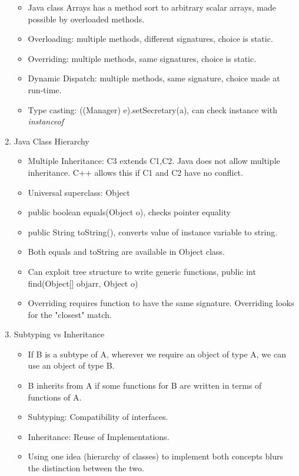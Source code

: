 \documentclass[a4paper]{article}
\begin{document}
\begin{enumerate}
\begin{itemize}
        \item Java class Arrays has a method sort to arbitrary scalar arrays, made possible by overloaded methods.
        \item Overloading: multiple methods, different signatures, choice is static.
        \item Overriding: multiple methods, same signatures, choice is static.
        \item Dynamic Dispatch: multiple methods, same signature, choice made at run-time.
        \item Type casting: ((Manager) e).setSecretary(a), can check instance with \textit{instanceof}
    \end{itemize}
    \item Java Class Hierarchy
    \begin{itemize}
        \item Multiple Inheritance: C3 extends C1,C2. Java does not allow multiple inheritance. C++ allows this if C1 and C2 have no conflict.
        \item Universal superclass: Object
        \item public boolean equals(Object o), checks pointer equality
        \item public String toString(), converts value of instance variable to string.
        \item Both equals and toString are available in Object class.
        \item Can exploit tree structure to write generic functions, public int find(Object[] objarr, Object o)
        \item Overriding requires function to have the same signature. Overriding looks for the "closest" match.
    \end{itemize}
    \item Subtyping vs Inheritance
    \begin{itemize}
        \item If B is a subtype of A, wherever we require an object of type A, we can use an object of type B.
        \item B inherits from A if some functions for B are written in terms of functions of A.
        \item Subtyping: Compatibility of interfaces.
        \item Inheritance: Reuse of Implementations.
        \item Using one idea (hierarchy of classes) to implement both concepts blurs the distinction between the two.

\end{itemize}
\end{enumerate}
\end{document}
